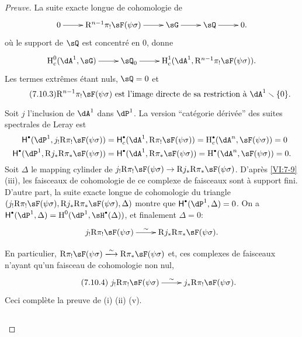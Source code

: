 \begin{proof}[Preuve]
La suite exacte longue de cohomologie de 
\[\xymatrix{
  0 \ar[r] 
    & \eR^{n-1} \pi_! \sF(\psi\sigma) \ar[r] 
    & \sG \ar[r] 
    & \sQ \ar[r] 
    & 0 \text{.} 
}\]
où le support de $\sQ$ est concentré en $0$, donne 
\[\xymatrix{
  \h_c^0(\dA^1,\sG) \ar[r] 
    & \sQ_0 \ar[r] 
    & \h_c^1(\dA^1,\eR^{n-1} \pi_! \sF(\psi\sigma)) \text{.} 
}\]
Les termes extrêmes étant nuls, $\sQ=0$ et 
\begin{equation*}\tag{7.10.3}\label{VI:eq:7-10-3}
  \text{$\eR^{n-1} \pi_! \sF(\psi\sigma)$ est l'image directe de sa restriction à $\dA^1\setminus \{0\}$.}
\end{equation*}

Soit $j$ l'inclusion de $\dA^1$ dans $\dP^1$. La version ``catégorie 
dérivée'' des suites spectrales de Leray est 
\begin{align*}
  \hh^\bullet(\dP^1,j_! \eR\pi_! \sF(\psi\sigma)) &= \hh_c^\bullet(\dA^1,\eR \pi_! \sF(\psi\sigma)) = \h_c^\bullet(\dA^n,\sF(\psi\sigma)) = 0 \\
  \hh^\bullet(\dP^1,\eR j_\ast \eR \pi_\ast \sF(\psi\sigma)) &= \hh^\bullet(\dA^1,\eR \pi_\ast \sF(\psi\sigma)) = \h^\bullet(\dA^n,\sF(\psi\sigma)) = 0 \text{.}
\end{align*}
Soit $\Delta$ le mapping cylinder de 
$j_! \eR\pi_! \sF(\psi\sigma) \to \eR j_\ast \eR \pi_\ast \sF(\psi\sigma)$. 
D'après \ref{VI:7-9}(iii), les faisceaux de cohomologie de ce complexe de 
faisceaux sont à support fini. D'autre part, la suite exacte longue de 
cohomologie du triangle 
$(j_!\eR \pi_! \sF(\psi\sigma),\eR j_\ast \eR \pi_\ast \sF(\psi\sigma),\Delta)$ 
montre que $\hh^\bullet(\dP^1,\Delta)=0$. On a 
$\hh^\bullet(\dP^1,\Delta) = \h^0(\dP^1,\sH^\bullet(\Delta))$, et finalement 
$\Delta=0$: 
\[\xymatrix{
  j_! \eR\pi_! \sF(\psi\sigma) \ar[r]^-\sim 
    & \eR j_\ast \eR \pi_\ast \sF(\psi\sigma) \text{.} 
}\]

En particulier, $\eR\pi_! \sF(\psi\sigma)\iso \eR\pi_\ast \sF(\psi\sigma)$ et, 
ces complexes de faisceaux n'ayant qu'un faisceau de cohomologie non nul, 
\begin{equation*}\tag{7.10.4}\label{VI:eq:7-10-4}
\xymatrix{
  j_! \eR \pi_! \sF(\psi\sigma) \ar[r]^-\sim 
    & j_\ast \eR \pi_! \sF(\psi\sigma) \text{.} 
}
\end{equation*}
Ceci complète la preuve de (i) (ii) (v). 





\subsection{}\label{VI:7-11}


\end{proof}
